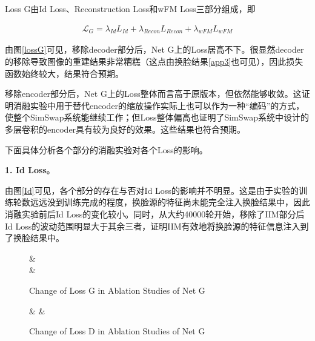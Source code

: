 \documentclass[a4paper]{article}
\begin{document}
Loss G由Id Loss、Reconstruction Loss和wFM Loss三部分组成，即

\vspace{-2.2em}
    \begin{align*}
        \mathcal{L}_G=\lambda_{Id}L_{Id} + \lambda_{Recon}L_{Recon} + \lambda_{wFM}L_{wFM}
\end{align*}

\vspace{-0.5em}
由图\ref{lossG}可见，移除decoder部分后，Net G上的Loss居高不下。很显然decoder的移除导致图像的重建结果非常糟糕（这点由换脸结果\ref{app3}也可见），因此损失函数始终较大，结果符合预期。

移除encoder部分后，Net G上的Loss整体而言高于原版本，但依然能够收敛。这证明消融实验中用于替代encoder的缩放操作实际上也可以作为一种“编码”的方式，使整个SimSwap系统能继续工作；但Loss整体偏高也证明了SimSwap系统中设计的多层卷积的encoder具有较为良好的效果。这些结果也符合预期。

\vspace{1em}
下面具体分析各个部分的消融实验对各个Loss的影响。

\vspace{1em}
\textbf{1. Id Loss}。

由图\ref{Id}可见，各个部分的存在与否对Id Loss的影响并不明显。这是由于实验的训练轮数远远没到训练完成的程度，换脸源的特征尚未能完全注入换脸结果中，因此消融实验前后Id Loss的变化较小。同时，从大约40000轮开始，移除了IIM部分后Id Loss的波动范围明显大于其余三者，证明IIM有效地将换脸源的特征信息注入到了换脸结果中。

\begin{figure*}[htb]
\centering

&
\\
&
\caption{Change of Loss G in Ablation Studies of Net G}
\label{lossG-G}
\end{figure*}

\vspace{-2em}
\begin{figure*}[!htb]
\centering

&
&

\caption{Change of Loss D in Ablation Studies of Net G}
\label{lossD-G}
\end{figure*}
\end{document}
